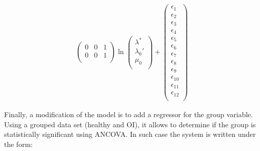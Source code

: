 \documentclass[a4paper,fleqn]{DC_ArtStyle}
\begin{document}
\begin{equation}
\begin{split}
\begin{pmatrix}
	0 & 0 & 1 \\
	0 & 0 & 1 \\
	\end{pmatrix} \ln\begin{pmatrix}
	\lambda^{*} \\
	\lambda_0' \\
	\mu_0 \\
	\end{pmatrix} + \begin{pmatrix}
	\epsilon_{1} \\
	\epsilon_{2} \\
	\epsilon_{3} \\
	\epsilon_{4} \\
	\epsilon_{5} \\
	\epsilon_{6} \\
	\epsilon_{7} \\
	\epsilon_{8} \\
	\epsilon_{9} \\
	\epsilon_{10} \\
	\epsilon_{11} \\
	\epsilon_{12} \\
	\end{pmatrix}
	\end{split}
	\label{EqA11}
	\end{equation}
	
	Finally, a modification of the model is to add a regressor for the group variable. Using a grouped data set (healthy and OI), it allows to determine if the group is statistically significant using ANCOVA. In such case the system is written under the form:\\
	
\end{document}
